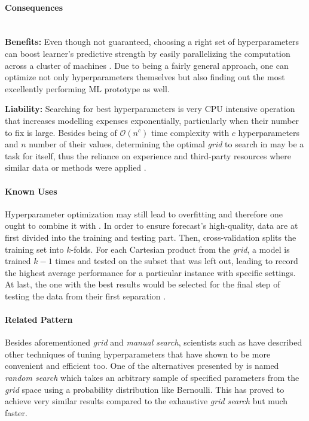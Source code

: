 \paragraph*{Consequences} ~\\
{\hspace*{14.5pt} \textbf{Benefits:} \hspace*{-5pt} }
Even though not guaranteed, choosing a right set of hyperparameters can boost learner's predictive strength by easily parallelizing the computation across a cluster of machines \parencite{BreckMLTest2016}.
Due to being a fairly general approach, one can optimize not only hyperparameters themselves but also finding out the most excellently performing \ac{ML} prototype as well.

\textbf{Liability:}
Searching for best hyperparameters is very \ac{CPU} intensive operation that increases modelling expenses exponentially, particularly when their number to fix is large.
Besides being of $\mathcal{O}(n^c)$ time complexity with $c$ hyperparameters and $n$ number of their values, determining the optimal \emph{grid} to search in may be a task for itself, thus the reliance on experience and third-party resources where similar data or methods were applied \parencite{DL2016Mit}. 

\paragraph*{Known Uses}
Hyperparameter optimization may still lead to overfitting and therefore one ought to combine it with  \parencites{JakeVanderPlas2016PythonHandbook}{minleegrid2005}. 
In order to ensure forecast's high-quality, data are at first divided into the training and testing part.
Then, cross-validation splits the training set into $k$-folds. 
For each Cartesian product from the \emph{grid}, a model is trained $k-1$ times and tested on the subset that was left out, leading to record the highest average performance for a particular instance with specific settings.
At last, the one with the best results would be selected for the final step of testing the data from their first separation \parencite{Olson2008}.

\paragraph*{Related Pattern}
Besides aforementioned \emph{grid} and \emph{manual search}, scientists such as \textcites{ReviewHyperOpt2015}{SAS2016} have described other techniques of tuning hyperparameters that have shown to be more convenient and efficient too. 
One of the alternatives presented by \textcite{Bergstra2012RandomOptimization} is named \emph{random search} which takes an arbitrary sample of specified parameters from the \emph{grid} space using a probability distribution like Bernoulli. 
This has proved to achieve very similar results compared to the exhaustive \emph{grid search} but much faster.

